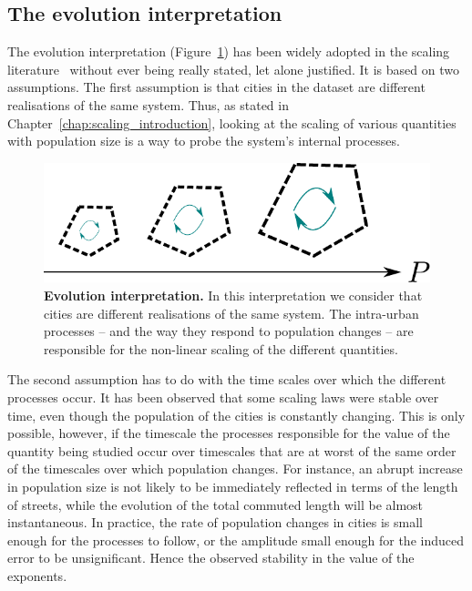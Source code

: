 \subsection{The evolution interpretation}
\label{sub:the_evolution_interpretation}

The evolution interpretation (Figure~\ref{fig:evolution_interpretation}) has
been widely adopted in the scaling literature~\cite{Bettencourt:2007,
Bettencourt:2013,Louf:2014_scaling} without ever being really stated, let alone
justified. It is based on two assumptions. The first assumption is that cities in the dataset
are different realisations of the same system. Thus, as stated in
Chapter~\ref{chap:scaling_introduction}, looking at the scaling of various
quantities with population size is a way to probe the system's internal
processes.

\begin{figure}[!h]
    \centering
    \includegraphics[width=\textwidth]{gfx/chapter-scaling/evolution-interpretation.pdf}
    \caption{{\bf Evolution interpretation.} In this interpretation we consider
    that cities are different realisations of the same system. The intra-urban
processes -- and the way they respond to population changes -- are responsible for the non-linear scaling of the different
quantities.\label{fig:evolution_interpretation}}
\end{figure}

The second assumption has to do with the time scales over which the different
processes occur. It has been observed that some scaling laws were stable
over time, even though the population of the cities is constantly changing.
This is only possible, however, if the timescale the processes responsible for
the value of the quantity being studied occur over timescales that are at worst
of the same order of the timescales over which population changes. For instance,
an abrupt increase in population size is not likely to be immediately reflected
in terms of the length of streets, while the evolution of the total commuted
length will be almost instantaneous. In practice, the rate of population
changes in cities is small enough for the processes to follow, or the amplitude
small enough for the induced
error to be unsignificant. Hence the observed stability in the value of the
exponents. 

